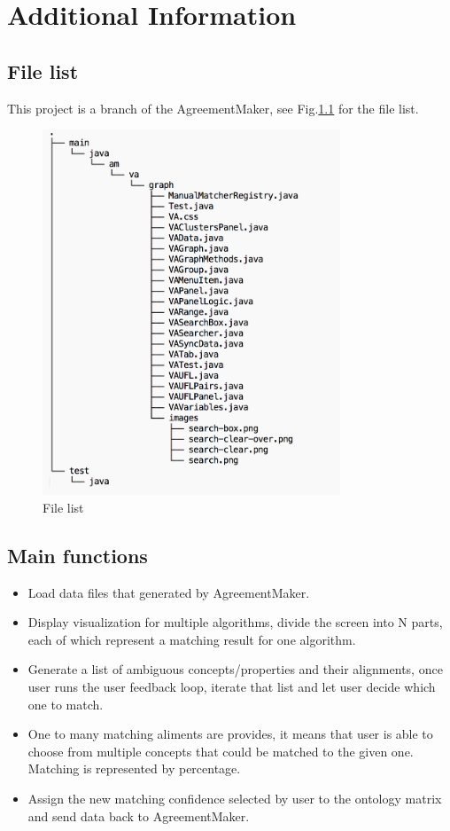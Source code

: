 
\chapter{Additional Information}
\section{File list}
This project is a branch of the AgreementMaker, see Fig.\ref{fig:file_list} for the file list.

\begin{figure}[htb]
	\centering
	\includegraphics[width=3.5in]{pics/Code_structure.png}
	\caption{File list}
	\label{fig:file_list}
\end{figure}

\section{Main functions}
\begin{itemize}
\item Load data files that generated by AgreementMaker.
\item Display visualization for multiple algorithms, divide the screen into N parts, each of which represent a matching result for one algorithm.
\item Generate a list of ambiguous concepts/properties and their alignments, once user runs the user feedback loop, iterate that list and let user decide which one to match.
\item One to many matching aliments are provides, it means that user is able to choose from multiple concepts that could be matched to the given one. Matching is represented by percentage.
\item Assign the new matching confidence selected by user to the ontology matrix and send data back to AgreementMaker.
\end{itemize}

